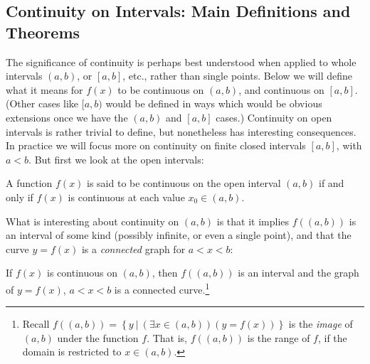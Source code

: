\bigskip

\subsection{Continuity on Intervals: Main Definitions and Theorems}

The significance of continuity is perhaps best understood
when applied to whole intervals $(a,b)$, or $[a,b]$, etc., rather
than single points.  Below we will define what it means for
$f(x)$ to be continuous on $(a,b)$, and continuous on $[a,b]$.
(Other cases like $[a,b)$ would be defined in ways which
would be obvious extensions once we have the $(a,b)$ and $[a,b]$ cases.)
Continuity on open intervals is rather trivial to define, 
but nonetheless has interesting
consequences.  In practice we will focus more on 
continuity on  finite closed intervals $[a,b]$, with $a<b$.
But first we look at the open intervals:

\begin{definition}
A function $f(x)$ is said to be continuous on the open
interval $(a,b)$ if and only if $f(x)$ is continuous
at each value $x_0\in(a,b)$.\footnotemark
\end{definition}
What is interesting about continuity on $(a,b)$ is that
it implies $f((a,b))$ is an interval of some kind
(possibly infinite, or even a single point),
and that the curve $y=f(x)$ is a {\it connected} graph
for $a<x<b$:

\begin{theorem}
If $f(x)$ is continuous on $(a,b)$, then
$f((a,b))$ is an interval and the graph of $y=f(x)$,
$a<x<b$ is a connected curve.\footnote{%
Recall $f((a,b))=\left\{y\ |\ (\exists x\in(a,b))(y=f(x))\right\}$
is the {\it image} of $(a,b)$ under the function $f$.  That is, 
$f((a,b))$ is the range of $f$, if the domain is restricted to $x\in(a,b)$.
}
\label{FirstConnectivityTheorem}\end{theorem}


